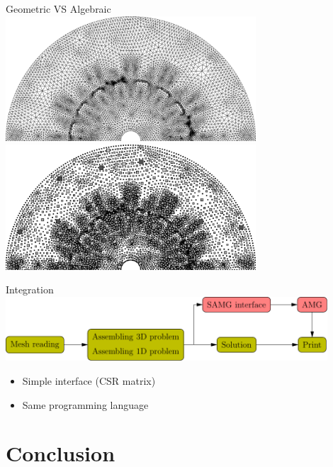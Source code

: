 \documentclass{beamer}
\begin{document}
\begin{frame}{Geometric VS Algebraic}
\centering
\vfill
\includegraphics[width=0.7\textwidth]{figure/compex1.png}
\vfill
\includegraphics[width=0.7\textwidth]{figure/compex2.png}
\vfill
\end{frame}
\begin{frame}{Integration}
\includegraphics[width=0.9\textwidth]{figure/flowchart}
\begin{itemize}
\item Simple interface (CSR matrix)
\item Same programming language
\end{itemize}
\end{frame}
\section{Conclusion}
\end{document}
